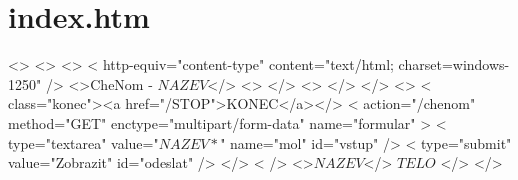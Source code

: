 \chapter{index.htm}

\begin{kodblok}
<>
<>
<>
< http-equiv="content-type"
      content="text/html; charset=windows-1250" />
<>CheNom - \underline{$NAZEV$}</>
<>
</>
<>
</>
</>
<>
< class="konec"><a href="/STOP">KONEC</a></>
< action="/chenom"              method="GET"
      enctype="multipart/form-data" name="formular" >
  < type="textarea" value="\underline{$NAZEV*$}" name="mol" id="vstup" />
  < type="submit" value="Zobrazit" id="odeslat" />
</>
< />
<>\underline{$NAZEV$}</> \underline{$TELO$}
</>
</>
\end{kodblok}
